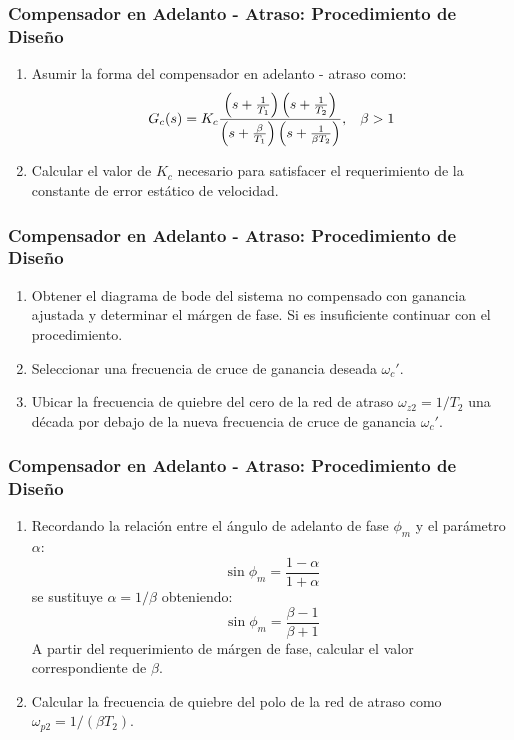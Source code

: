 \documentclass[aspectratio=169, handout]{beamer}
\theoremstyle{definition}
\theoremstyle{plain}
\theoremstyle{remark}
\newcounter{saveenumi}
\newcommand{\seti}{\setcounter{saveenumi}{\value{enumi}}}
\newcommand{\conti}{\setcounter{enumi}{\value{saveenumi}}}
\begin{document}
\begin{frame}[<+->]\frametitle{Compensador en Adelanto - Atraso: Procedimiento de Diseño}
	\begin{enumerate}
		\item Asumir la forma del compensador en adelanto - atraso como:
		\begin{equation*}
			G_c(s) = K_c \frac{\left(s+\frac{1}{T_1}\right)\left(s+\frac{1}{T_2}\right)}{\left(s+\frac{\beta}{T_1}\right)\left(s+\frac{1}{\beta T_2}\right)}, \hspace*{3mm} \beta > 1
		\end{equation*}
		\item Calcular el valor de $K_c$ necesario para satisfacer el requerimiento de la constante de error estático de velocidad.
		\seti
	\end{enumerate}		
\end{frame}

\begin{frame}[<+->]\frametitle{Compensador en Adelanto - Atraso: Procedimiento de Diseño}
	\begin{enumerate}
		\conti
		\item Obtener el diagrama de bode del sistema no compensado con ganancia ajustada y determinar el márgen de fase. Si es insuficiente continuar con el procedimiento.
		\item Seleccionar una frecuencia de cruce de ganancia deseada $\omega_c'$.
		\item Ubicar la frecuencia de quiebre del cero de la red de atraso $\omega_{z2} = 1/T_2$ una década por debajo de la nueva frecuencia de cruce de ganancia $\omega_c'$.
		\seti
	\end{enumerate}		
\end{frame}

\begin{frame}[<+->]\frametitle{Compensador en Adelanto - Atraso: Procedimiento de Diseño}
	\begin{enumerate}
		\conti
		\item Recordando la relación entre el ángulo de adelanto de fase $\phi_m$ y el parámetro $\alpha$:
		\begin{equation*}
			\sin \phi_m = \frac{1-\alpha}{1+\alpha}
		\end{equation*}
		se sustituye $\alpha = 1/\beta$ obteniendo:
		\begin{equation*}
			\sin \phi_m = \frac{\beta - 1}{\beta + 1}
		\end{equation*}
		A partir del requerimiento de márgen de fase, calcular el valor correspondiente de $\beta$.
		\item Calcular la frecuencia de quiebre del polo de la red de atraso como $\omega_{p2} = 1/(\beta T_2)$.
		\seti
	\end{enumerate}		
\end{frame}
\end{document}
